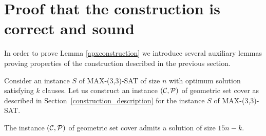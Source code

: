 \section{Proof that the construction is correct and sound}

In order to prove Lemma \ref{apxconstruction} we introduce several
auxiliary lemmas proving properties of the construction
described in the previous section.

Consider an instance $S$ of MAX-(3,3)-SAT of size $n$
with optimum solution satisfying $k$ clauses.
Let us construct an instance $(\mathcal{C}, \mathcal{P})$ of geometric set cover
as described in Section~\ref{construction_description}
for the instance $S$ of MAX-(3,3)-SAT.

\begin{lemma}
	\label{construction_correctness}
	The instance $(\mathcal{C}, \mathcal{P})$ of geometric set cover
	admits a solution of size $15n - k$.
\end{lemma}

